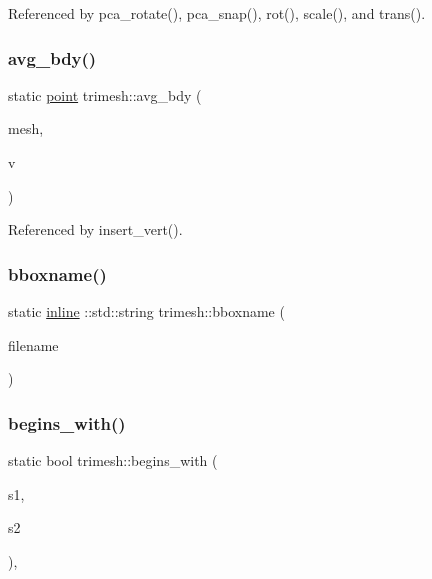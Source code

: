 Referenced by pca\+\_\+rotate(), pca\+\_\+snap(), rot(), scale(), and trans().

\mbox{\label{namespacetrimesh_a0915fd4cff6192270f44c4ce28f8eafd}} 
\subsubsection{\texorpdfstring{avg\+\_\+bdy()}{avg\_bdy()}}
{\footnotesize\ttfamily static \hyperlink{namespacetrimesh_a325b99fd6454b22fa4c4bc3223271b2c}{point} trimesh\+::avg\+\_\+bdy (\begin{DoxyParamCaption}\item[{\hyperlink{classtrimesh_1_1TriMesh}{Tri\+Mesh} $\ast$}]{mesh,  }\item[{int}]{v }\end{DoxyParamCaption})\hspace{0.3cm}{\ttfamily [static]}}



Referenced by insert\+\_\+vert().

\mbox{\label{namespacetrimesh_a347e2f66e5bae546671794bf1df500d0}} 
\subsubsection{\texorpdfstring{bboxname()}{bboxname()}}
{\footnotesize\ttfamily static \hyperlink{XForm_8h_a00d24c7231be28dbaf71f5408f30e44c}{inline} \+::std\+::string trimesh\+::bboxname (\begin{DoxyParamCaption}\item[{const \+::std\+::string \&}]{filename }\end{DoxyParamCaption})\hspace{0.3cm}{\ttfamily [static]}}

\mbox{\label{namespacetrimesh_a422b589a796509785836b3f3f6f62035}} 
\subsubsection{\texorpdfstring{begins\+\_\+with()}{begins\_with()}\hspace{0.1cm}{\footnotesize\ttfamily [1/2]}}
{\footnotesize\ttfamily static bool trimesh\+::begins\+\_\+with (\begin{DoxyParamCaption}\item[{const char $\ast$}]{s1,  }\item[{const char $\ast$}]{s2 }\end{DoxyParamCaption})\hspace{0.3cm}{\ttfamily [inline]}, {\ttfamily [static]}}



